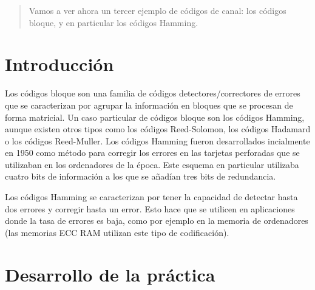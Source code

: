 \documentclass[es,practica]{uah}
\begin{document}

\maketitle

\begin{abstract}
	Vamos a ver ahora un tercer ejemplo de códigos de canal: los códigos bloque, y en particular los códigos Hamming.
\end{abstract}

\section{Introducción}

Los códigos bloque son una familia de códigos detectores/correctores de errores que se caracterizan por agrupar la información en bloques que se procesan de forma matricial. Un caso particular de códigos bloque son los códigos Hamming, aunque existen otros tipos como los códigos Reed-Solomon, los códigos Hadamard o los códigos Reed-Muller. Los códigos Hamming fueron desarrollados incialmente en 1950 como método para corregir los errores en las tarjetas perforadas que se utilizaban en los ordenadores de la época. Este esquema en particular utilizaba cuatro bits de información a los que se añadían tres bits de redundancia.

Los códigos Hamming se caracterizan por tener la capacidad de detectar hasta dos errores y corregir hasta un error. Esto hace que se utilicen en aplicaciones donde la tasa de errores es baja, como por ejemplo en la memoria de ordenadores (las memorias ECC RAM utilizan este tipo de codificación).


\section{Desarrollo de la práctica}
\end{document}
